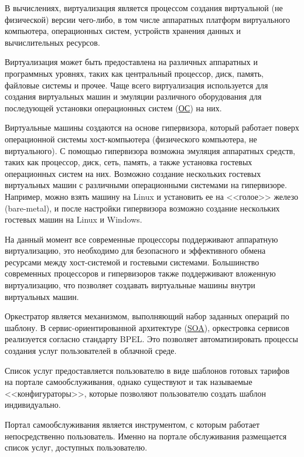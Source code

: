 
В вычислениях, виртуализация является процессом создания виртуальной (не физической) версии чего-либо, в том числе аппаратных платформ виртуального компьютера, операционных систем, устройств хранения данных и вычислительных ресурсов.

Виртуализация может быть предоставлена на различных аппаратных и программных уровнях, таких как центральный процессор, диск, память, файловые системы и прочее.
Чаще всего виртуализация используется для создания виртуальных машин и эмуляции различного оборудования для последующей установки операционных систем (\hyperlink{os}{ОС}) на них.

Виртуальные машины создаются на основе гипервизора, который работает поверх операционной системы хост-компьютера (физического компьютера, не виртуального).
С помощью гипервизора возможна эмуляция аппаратных средств, таких как процессор, диск, сеть, память, а также установка гостевых операционных систем на них.
Возможно создание нескольких гостевых виртуальных машин с различными операционными системами на гипервизоре.
Например, можно взять машину на Linux и установить ее на <<голое>> железо (bare-metal), и после настройки гипервизора возможно создание нескольких гостевых машин на Linux и Windows.

На данный момент все современные процессоры поддерживают аппаратную виртуализацию, это необходимо для безопасного и эффективного обмена ресурсами между хост-системой и гостевыми системами.
Большинство современных процессоров и гипервизоров также поддерживают вложенную виртуализацию, что позволяет создавать виртуальные машины внутри виртуальных машин.

Оркестратор является механизмом, выполняющий набор заданных операций по шаблону.
В сервис-ориентированной архитектуре (\hyperlink{soa}{SOA}), оркестровка сервисов реализуется согласно стандарту BPEL.
Это позволяет автоматизировать процессы создания услуг пользователей в облачной среде.

Список услуг предоставляется пользователю в виде шаблонов готовых тарифов на портале самообслуживания, однако существуют и так называемые <<конфигураторы>>, которые позволяют пользователю создать шаблон индивидуально.

Портал самообслуживания является инструментом, с которым работает непосредственно пользователь.
Именно на портале обслуживания размещается список услуг, доступных пользователю.

